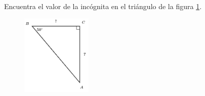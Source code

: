 \question[15]  Encuentra el valor de la incógnita en el triángulo de la figura \ref{fig:lados_functrig_28}.
\begin{figure}[H]
    \begin{center}
        \includegraphics[width=0.3\textwidth]{../images/lados_functrig_28.png}
    \end{center}
    \caption{}
    \label{fig:lados_functrig_28}
\end{figure}